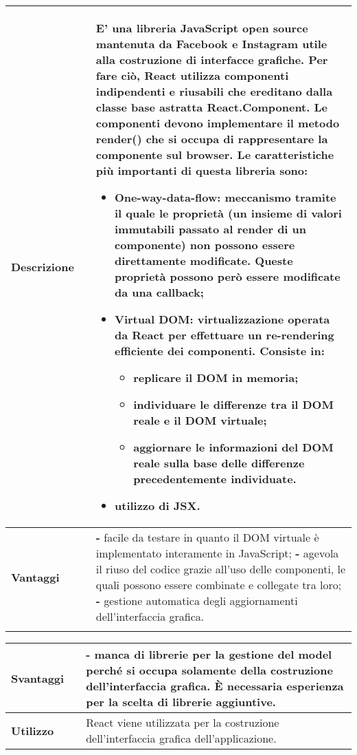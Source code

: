 \begin{table}[H]
	\centering
	\begin{tabular}{p{2cm}p{0.5cm}p{11.5cm}}
		\arrayrulecolor{lightgray}
		\toprule
		\textbf{Descrizione} & &
		E' una libreria JavaScript open source mantenuta da Facebook e Instagram utile alla costruzione di interfacce grafiche. Per fare ciò, React utilizza componenti indipendenti e riusabili che ereditano dalla classe base astratta React.Component. Le componenti devono implementare il metodo render() che si occupa di rappresentare la componente sul browser.
		Le caratteristiche più importanti di questa libreria sono:
		\begin{itemize}
			\item {\textbf{One-way-data-flow:}} meccanismo tramite il quale le proprietà (un insieme di valori immutabili passato al render di un componente) non possono essere direttamente modificate. Queste proprietà possono però essere modificate da una callback;
			\item {\textbf{Virtual DOM:}} virtualizzazione operata da React per effettuare un re-rendering efficiente dei componenti. 
			Consiste in:
			\begin{itemize}
				\item replicare il DOM in memoria;
				\item individuare le differenze tra il DOM reale e il DOM virtuale;
				\item aggiornare le informazioni del DOM reale sulla base delle differenze precedentemente individuate.
			\end{itemize}
			\item utilizzo di JSX.
		\end{itemize}
		\\ \midrule \textbf{Vantaggi} & &
		\textbf{- }facile da testare in quanto il DOM virtuale è implementato interamente in JavaScript;
		\newline
		\textbf{- }agevola il riuso del codice grazie all'uso delle componenti, le quali possono essere combinate e collegate tra loro;
		\newline
		\textbf{- } gestione automatica degli aggiornamenti dell'interfaccia grafica.
		\\ 
		\\ \bottomrule
	\end{tabular}
\end{table}

\begin{table}[H]
	\centering
	\begin{tabular}{p{2cm}p{0.5cm}p{11.5cm}}
		\arrayrulecolor{lightgray}
		\toprule	
		\textbf{Svantaggi} & &
		\textbf{- }manca di librerie per la gestione del model perché si occupa solamente della costruzione dell'interfaccia grafica. È necessaria esperienza per la scelta di librerie aggiuntive.
		\\ \midrule
		\textbf{Utilizzo} & &
		React viene utilizzata per la costruzione dell'interfaccia grafica dell'applicazione.
		\\ \bottomrule
	\end{tabular}
\end{table}


